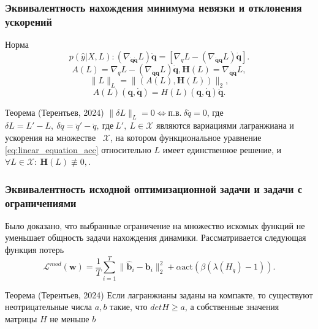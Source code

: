 \documentclass{beamer}
\begin{document}
\begin{frame}
\frametitle{Эквивалентность нахождения минимума невязки и отклонения ускорений}
\begin{block} {Норма}
\[
p(\hat{y}| X, L): \left(\nabla_{\dot{\mathbf{q}} \dot{\mathbf{q}}} L\right)\ddot{\mathbf{q}} = \left[\nabla_{q} L-\left(\nabla_{\dot{\mathbf{q}}\mathbf{q}} L\right) \dot{\mathbf{q}}\right].
\]
$$A(L) = \nabla_{q} L-\left(\nabla_{\dot{\mathbf{q}}\mathbf{q}} L\right) \dot{\mathbf{q}}, \mathbf{H}(L) = \nabla_{\dot{\mathbf{q}} \dot{\mathbf{q}}} L,$$
$$\|L\|_L = \|(A(L), \mathbf{H}(L))\|_2,$$
\begin{equation}\label{eq:linear_equation_acc}
A(L)(\mathbf{q}, \dot{\mathbf{q}}) = H(L)(\mathbf{q}, \dot{\mathbf{q}})\ddot{\mathbf{q}}.
\end{equation}
\end{block}

\begin{block} {Теорема (Терентьев, 2024)}
$\|\delta L\|_L = 0 \Leftrightarrow \text{п.в.}~\delta \ddot{q} = 0$, где $\delta L = L' - L, ~\delta \ddot{q} = \ddot{q}' - \ddot{q}, ~\text{где} \ L',\ L \in \mathcal {X}$ являются вариациями лагранжиана и ускорения на множестве ~$\mathcal {X}$, на котором функциональное уравнение \ref{eq:linear_equation_acc} относительно $L$ имеет единственное решение, и $\forall L\in \mathcal{X}:~\mathbf{H}(L) \not\equiv 0, $.
\end{block}

\end{frame}



\begin{frame}
\frametitle{Эквивалентность исходной оптимизационной задачи и задачи с ограничениями}

Было доказано, что выбранные ограничение на множество искомых функций не уменьшает общность задачи нахождения динамики. Рассматривается следующая функция потерь
$$
 \mathcal{L}^{mod}(\textbf{w}) = \frac{1}{T}\sum_{i=1}^{T} \| \mathbf{\hat{b}}_i - \mathbf{b}_i \|_2^2  + \alpha \text{act}(\beta (\lambda(H_{\ddot{q}}) - 1)).
$$

\begin{block} {Теорема (Терентьев, 2024)}
Если лагранжианы заданы на компакте, то существуют неотрицательные числа $a, b$ такие, что $det H \ge a$, а собственные значения матрицы $H$ не меньше $b$
\end{block} 
\end{frame}
\end{document}

